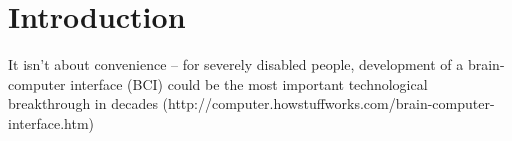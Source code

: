 
\chapter*{Introduction}
It isn't about convenience -- for severely disabled people, development of a brain-computer interface (BCI) could be the most important technological breakthrough in decades (http://computer.howstuffworks.com/brain-computer-interface.htm)